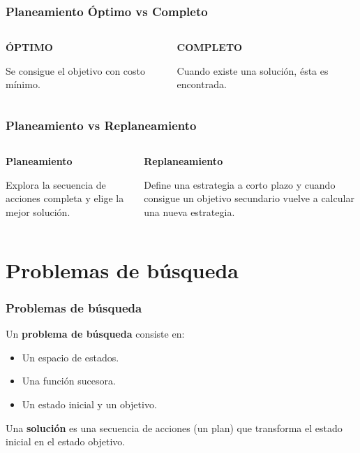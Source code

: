 \documentclass[10pt]{beamer}
\begin{document}
\begin{frame}
  \frametitle{Planeamiento Óptimo vs Completo}
  \begin{columns}
    \begin{column}{0.5\textwidth}
      \textbf{ÓPTIMO}

      Se consigue el objetivo con \alert{costo mínimo}.
    \end{column}
    \begin{column}{0.5\textwidth}
      \textbf{COMPLETO}

      Cuando existe una solución, ésta es encontrada.
    \end{column}
  \end{columns}
\end{frame}

\begin{frame}
  \frametitle{Planeamiento vs Replaneamiento}
  \begin{columns}
    \begin{column}{0.5\textwidth}
      \textbf{Planeamiento}
      
      Explora la secuencia de acciones completa y elige la mejor solución.
    \end{column}
    \begin{column}{0.5\textwidth}
      \textbf{Replaneamiento}
      
      Define una estrategia a corto plazo y cuando consigue un objetivo secundario vuelve a 
      calcular una nueva estrategia.
    \end{column}
  \end{columns}
\end{frame}

\section{Problemas de búsqueda}
\begin{frame}
  \frametitle{Problemas de búsqueda}

  Un \textbf{problema de búsqueda} consiste en:
  \begin{itemize}
    \item Un \alert{espacio de estados}.
    \item Una \alert{función sucesora}.
    \item Un estado \alert{inicial} y un \alert{objetivo}.
  \end{itemize}
  
  Una \textbf{solución} es una secuencia de acciones (un plan) que transforma el estado inicial
  en el estado objetivo.
\end{frame}
\end{document}
